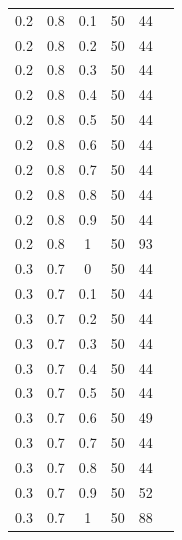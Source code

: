 \documentclass[12pt]{report}
\begin{document}
\begin{table}
\begin{minipage}[h!]{0.10\hsize}
\begin{center}
{\begin{tabular}{c@{\hspace{5mm}}c@{\hspace{5mm}}c@{\hspace{5mm}}c@{\hspace{5mm}}c@{\hspace{5mm}}c}
				0.2     &0.8    &0.1    &50    &44\\
				0.2     &0.8    &0.2    &50    &44\\
				0.2     &0.8    &0.3    &50    &44\\
				0.2     &0.8    &0.4    &50    &44\\
				0.2     &0.8    &0.5    &50    &44\\
				0.2     &0.8    &0.6    &50    &44\\
				0.2     &0.8    &0.7    &50    &44\\
				0.2     &0.8    &0.8    &50    &44\\
				0.2     &0.8    &0.9    &50    &44\\
				0.2     &0.8    &1      &50     &93\\
				\midrule
				0.3     &0.7    &0      &50    &44\\
				0.3     &0.7    &0.1    &50    &44\\
				0.3     &0.7    &0.2    &50    &44\\
				0.3     &0.7    &0.3    &50    &44\\
				0.3     &0.7    &0.4    &50    &44\\
				0.3     &0.7    &0.5    &50    &44\\
				0.3     &0.7    &0.6    &50    &49\\
				0.3     &0.7    &0.7    &50    &44\\
				0.3     &0.7    &0.8    &50    &44\\
				0.3     &0.7    &0.9    &50   &52\\
				0.3     &0.7    &1      &50    &88\\
				\bottomrule
			\end{tabular}}
			\label{T:log111}
		\end{center}
	\end{minipage}
	\hfill
	\begin{minipage}[!h]{0.50\hsize}\centering
		\begin{center}
\end{center}
\end{minipage}
\end{table}
\end{document}
